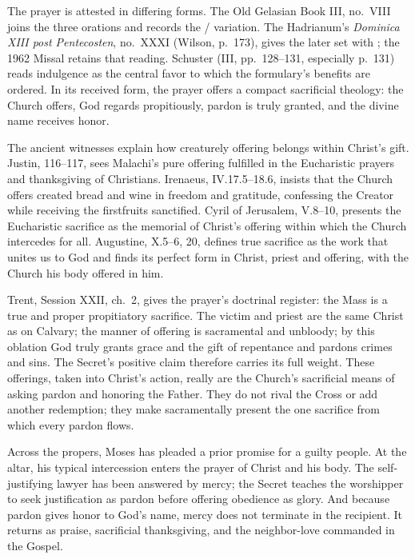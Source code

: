 The prayer is attested in differing forms. The Old Gelasian Book
III, no.~VIII joins the three orations and records the
/ variation. The Hadrianum's
\emph{Dominica XIII post Pentecosten}, no.~XXXI (Wilson, p.~173), gives the
later set with ; the 1962 Missal retains that reading.
Schuster (III, pp.~128--131, especially p.~131) reads indulgence as the
central favor to which the formulary's benefits are ordered. In its received
form, the prayer offers a compact sacrificial theology: the Church offers, God
regards propitiously, pardon is truly granted, and the divine name receives
honor.

The ancient witnesses explain how creaturely offering belongs within Christ's
gift. Justin,  116--117, sees Malachi's pure
offering fulfilled in the Eucharistic prayers and thanksgiving of Christians.
Irenaeus,  IV.17.5--18.6, insists that the Church offers
created bread and wine in freedom and gratitude, confessing the Creator while
receiving the firstfruits sanctified. Cyril of Jerusalem,
 V.8--10, presents the Eucharistic sacrifice as
the memorial of Christ's offering within which the Church intercedes for all.
Augustine,  X.5--6, 20, defines true sacrifice as the work
that unites us to God and finds its perfect form in Christ, priest and offering,
with the Church his body offered in him.

Trent, Session XXII, ch.~2, gives the prayer's doctrinal register: the Mass is
a true and proper propitiatory sacrifice. The victim and priest are the same
Christ as on Calvary; the manner of offering is sacramental and unbloody; by
this oblation God truly grants grace and the gift of repentance and pardons
crimes and sins. The Secret's positive claim therefore carries its full
weight. These offerings, taken into Christ's action, really are the
Church's sacrificial means of asking pardon and honoring the Father. They do
not rival the Cross or add another redemption; they make sacramentally present
the one sacrifice from which every pardon flows.

Across the propers, Moses has pleaded a prior promise for
a guilty people. At the altar, his typical intercession enters the prayer of
Christ and his body. The self-justifying lawyer has been answered by mercy; the
Secret teaches the worshipper to seek justification as pardon before offering
obedience as glory. And because pardon gives honor to God's name, mercy does
not terminate in the recipient. It returns as praise, sacrificial
thanksgiving, and the neighbor-love commanded in the Gospel.

